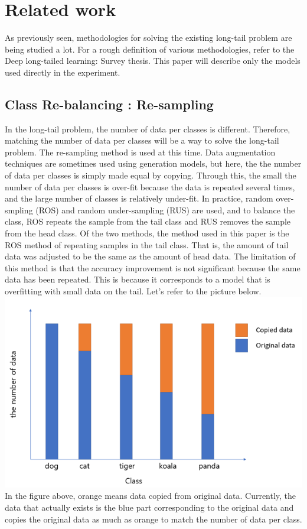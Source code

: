 \documentclass[extendedabs]{bmvc2k}
\begin{document}
\section{Related work}
  \quad As previously seen, methodologies for solving the existing long-tail problem are being studied a lot. For a rough definition of various methodologies, refer to the Deep long-tailed learning: Survey thesis.\cite{zhang2021deep} 
  This paper will describe only the models used directly in the experiment.
  \subsection{Class Re-balancing : Re-sampling}
    \quad In the long-tail problem, the number of data per classes is different. Therefore, matching the number of data per classes will be a way to solve the long-tail problem. 
    The re-sampling method is used at this time. Data augmentation techniques are sometimes used using generation models, but here, the the number of data per classes is 
    simply made equal by copying. Through this, the small the number of data per classes is over-fit because the data is repeated several times, and the large number of classes 
    is relatively under-fit. In practice, random over-smpling (ROS) and random under-sampling (RUS) are used, and to balance the class, ROS repeats the sample from the tail class 
    and RUS removes the sample from the head class. Of the two methods, the method used in this paper is the ROS method of repeating samples in the tail class. 
    That is, the amount of tail data was adjusted to be the same as the amount of head data. The limitation of this method is that the accuracy improvement is not significant 
    because the same data has been repeated. This is because it corresponds to a model that is overfitting with small data on the tail. Let's refer to the picture below.
    \newline  \includegraphics[width=\linewidth]{images/02_project.PNG}
    In the figure above, orange means data copied from original data. Currently, the data that actually exists is the blue part corresponding to the original data and copies 
    the original data as much as orange to match the number of data per class.
\end{document}
